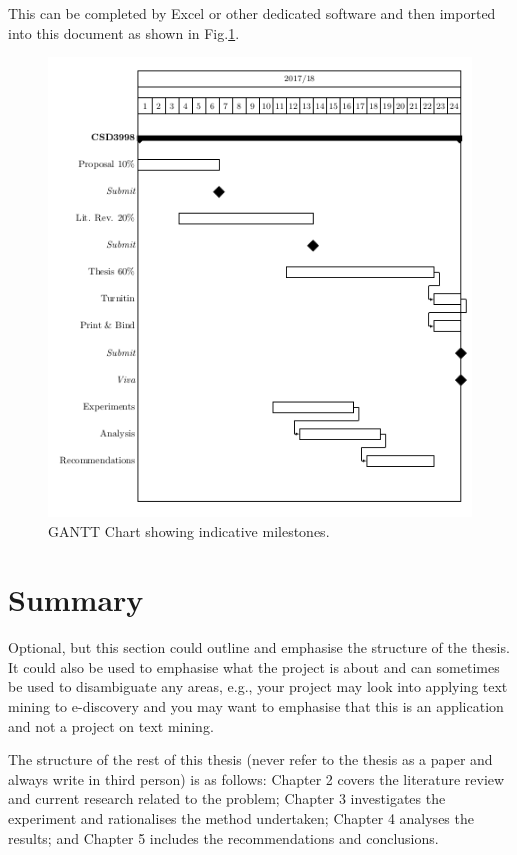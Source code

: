 This can be completed by Excel or other dedicated software and then imported into this document as shown in Fig.\ref{fi:GANTT}.



%
% 
\begin{figure}
\centering
\includegraphics[scale=0.4]{ch1/gantt}
\caption{GANTT Chart showing indicative milestones.}\label{fi:GANTT}
\end{figure}


\section{Summary}

Optional, but this section could outline and emphasise the structure of the thesis. It could also be used to emphasise what the project is about and can sometimes be used to disambiguate any areas, e.g., your project may look into applying text mining to e-discovery and you may want to emphasise that this is an application and not a project on text mining.

The structure of the rest of this thesis (never refer to the thesis as a paper and always write in third person) is as follows: Chapter 2 covers the literature review and current research related to the problem; Chapter 3 investigates the experiment and rationalises the method undertaken; Chapter 4 analyses the results; and Chapter 5 includes the recommendations and conclusions. 


